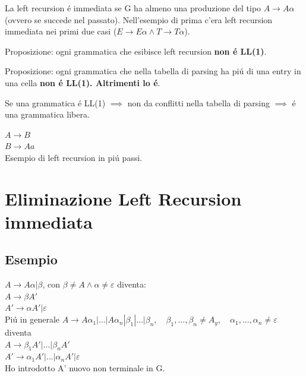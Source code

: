 La left recursion \'e immediata se G ha almeno una produzione del tipo $A \rightarrow A \alpha$ (ovvero se succede nel passato).
Nell'esempio di prima c'era left recursion immediata nei primi due casi ($E \rightarrow E\alpha \land T \rightarrow T\alpha $).

\begin{tcolorbox}\begin{center}
    Proposizione: ogni grammatica che esibisce left recursion \textbf{non \'e LL(1)}.
\end{center}\end{tcolorbox}

\begin{tcolorbox}\begin{center}
    Proposizione: ogni grammatica che nella tabella di parsing ha pi\'u di una entry in una cella \textbf{non \'e LL(1). Altrimenti lo \'e}.
\end{center}\end{tcolorbox}

\begin{tcolorbox}\begin{center}
    Se una grammatica \'e LL(1) $\implies$ non da conflitti nella tabella di parsing $\implies$ \'e una grammatica libera.
\end{center}\end{tcolorbox}

$A \rightarrow B$\\
$B \rightarrow Aa$\\
Esempio di left recursion in pi\'u passi.

\section{Eliminazione Left Recursion immediata}

\subsection{Esempio}
$A \rightarrow A \alpha | \beta $, con $\beta \not= A \land \alpha \not= \varepsilon$ diventa:\\
$A \rightarrow \beta A'$\\
$A' \rightarrow \alpha A' | \varepsilon$\\

Pi\'u in generale
$A \rightarrow A\alpha _1 | ... | A\alpha _n | \beta _1 | ... | \beta _n, \quad \beta _1, ..., \beta _n \not= A_y,\quad \alpha_1,...,\alpha_n \not= \varepsilon$ diventa\\
$A \rightarrow \beta _1 A'|...|\beta _n A' $\\
$A' \rightarrow \alpha _1 A'|...|\alpha _n A' | \varepsilon $\\
Ho introdotto A' nuovo non terminale in G.

